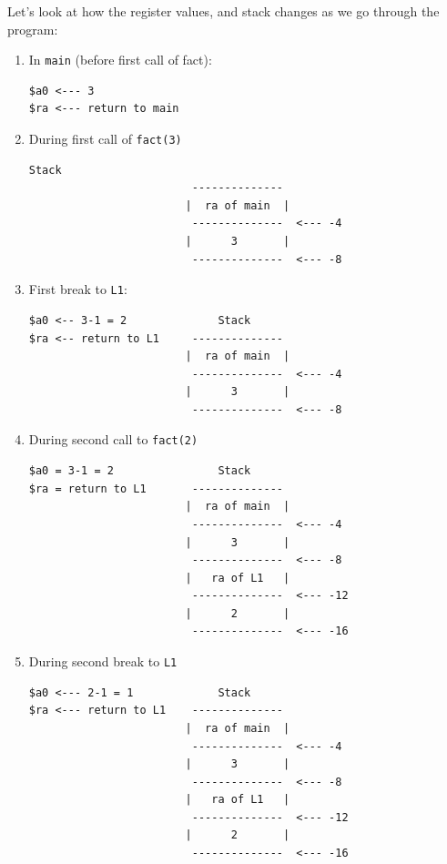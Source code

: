 \documentclass[10pt]{article}
\begin{document}
Let's look at how the register values, and stack changes as we go through the program:
\begin{enumerate}
\item In \texttt{main} (before first call of fact):
  \begin{lstlisting}[style=CStyle, xleftmargin=5.0ex, aboveskip=1em, belowskip=1em, escapeinside=..]
$a0 <--- 3
$ra <--- return to main
\end{lstlisting}
  
\item During first call of \texttt{fact(3)}
  \begin{lstlisting}[style=CStyle,  xleftmargin=5.0ex, aboveskip=1em, belowskip=1em, escapeinside=..]
                             Stack
                         --------------
                        |  ra of main  |
                         --------------  <--- -4
                        |      3       |
                         --------------  <--- -8
\end{lstlisting}
\pagebreak
\item First break to \texttt{L1}:
\begin{lstlisting}[style=CStyle, xleftmargin=5.0ex, aboveskip=1em, belowskip=1em, escapeinside=..]
$a0 <-- 3-1 = 2              Stack
$ra <-- return to L1     --------------
                        |  ra of main  |
                         --------------  <--- -4
                        |      3       |
                         --------------  <--- -8
\end{lstlisting}

\item During second call to \texttt{fact(2)}
\begin{lstlisting}[style=CStyle, xleftmargin=5.0ex, aboveskip=2em, belowskip=2em, escapeinside=..]
$a0 = 3-1 = 2                Stack
$ra = return to L1       --------------
                        |  ra of main  |
                         --------------  <--- -4
                        |      3       |
                         --------------  <--- -8
                        |   ra of L1   |
                         --------------  <--- -12
                        |      2       |
                         --------------  <--- -16
\end{lstlisting}

\item During second break to \texttt{L1}
\begin{lstlisting}[style=CStyle, xleftmargin=5.0ex, aboveskip=1em, belowskip=1em, escapeinside=..]
$a0 <--- 2-1 = 1             Stack
$ra <--- return to L1    --------------
                        |  ra of main  |
                         --------------  <--- -4
                        |      3       |
                         --------------  <--- -8
                        |   ra of L1   |
                         --------------  <--- -12
                        |      2       |
                         --------------  <--- -16
\end{lstlisting}


\end{enumerate}
\end{document}
